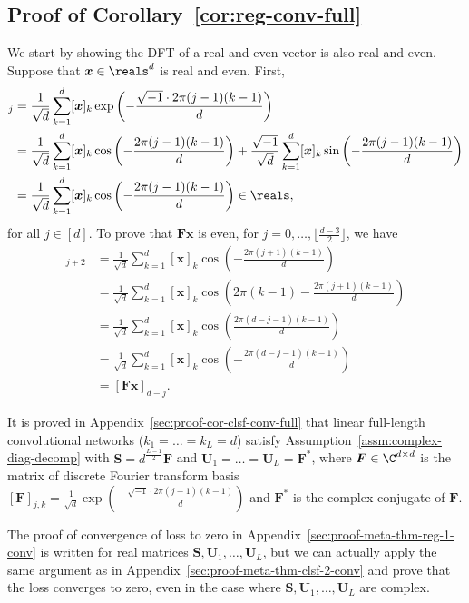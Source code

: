 \documentclass{article} %
\def\vx{{\bm{x}}}
\def\mF{{\bm{F}}}
\def\mS{{\bm{S}}}
\def\mU{{\bm{U}}}
\begin{document}
\subsection{Proof of Corollary~\ref{cor:reg-conv-full}}
\label{sec:proof-reg-conv-full}
We start by showing the DFT of a real and even vector is also real and even. Suppose that $\vx \in \reals^d$ is real and even. First,
\begin{align*}
    [\mF \vx]_j &= \frac{1}{\sqrt{d}} \sum_{k=1}^d [\vx]_k \exp \left (-\frac{\sqrt{-1} \cdot 2 \pi (j-1)(k-1)}{d} \right)\\
    &=
    \frac{1}{\sqrt{d}} \sum_{k=1}^d [\vx]_k \cos \left (-\frac{2 \pi (j-1)(k-1)}{d} \right)
    + 
    \frac{\sqrt{-1}}{\sqrt{d}} \sum_{k=1}^d [\vx]_k \sin \left (-\frac{2 \pi (j-1)(k-1)}{d} \right)\\
    &=
    \frac{1}{\sqrt{d}} \sum_{k=1}^d [\vx]_k \cos \left (-\frac{2 \pi (j-1)(k-1)}{d} \right) \in \reals,
\end{align*}
for all $j \in [d]$.
To prove that $\mF\vx$ is even, for $j = 0, \dots, \lfloor \frac{d-3}{2} \rfloor$, we have
\begin{align*}
    [\mF \vx]_{j+2} &= \frac{1}{\sqrt{d}} \sum_{k=1}^d [\vx]_k \cos \left (-\frac{2 \pi (j+1)(k-1)}{d} \right)\\
    &=
    \frac{1}{\sqrt{d}} \sum_{k=1}^d [\vx]_k \cos \left (2\pi(k-1)-\frac{2 \pi (j+1)(k-1)}{d} \right)\\
    &=
    \frac{1}{\sqrt{d}} \sum_{k=1}^d [\vx]_k \cos \left (\frac{2 \pi (d-j-1)(k-1)}{d} \right)\\
    &=
    \frac{1}{\sqrt{d}} \sum_{k=1}^d [\vx]_k \cos \left (-\frac{2 \pi (d-j-1)(k-1)}{d} \right)\\
    &= [\mF \vx]_{d-j}.
\end{align*}

It is proved in Appendix~\ref{sec:proof-cor-clsf-conv-full} that linear full-length convolutional networks ($k_1 = \dots = k_L = d$) satisfy Assumption~\ref{assm:complex-diag-decomp} with
$\mS = d^{\frac{L-1}{2}} \mF$ and $\mU_1 = \dots = \mU_L = \mF^*$, where $\mF \in \C^{d \times d}$ is the matrix of discrete Fourier transform basis $[\mF]_{j,k} = \frac{1}{\sqrt{d}} \exp(-\frac{\sqrt{-1} \cdot 2 \pi (j-1)(k-1)}{d})$ and $\mF^*$ is the complex conjugate of $\mF$.

The proof of convergence of loss to zero in Appendix~\ref{sec:proof-meta-thm-reg-1-conv} is written for real matrices $\mS, \mU_1, \dots, \mU_L$, but we can actually apply the same argument as in Appendix~\ref{sec:proof-meta-thm-clsf-2-conv} and prove that the loss converges to zero, even in the case where $\mS, \mU_1, \dots, \mU_L$ are complex.
\end{document}

